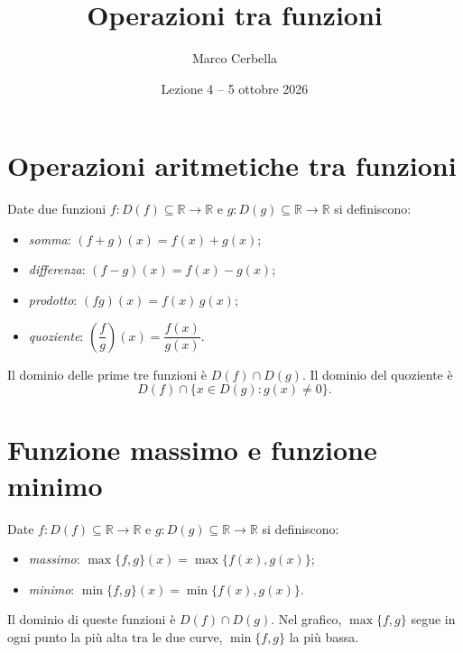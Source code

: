 \documentclass[11pt,a4paper]{article}
\title{Operazioni tra funzioni}
\author{Marco Cerbella}
\date{Lezione 4 -- 5 ottobre 2026}
\theoremstyle{definition}
\begin{document}
\maketitle

\section{Operazioni aritmetiche tra funzioni}

Date due funzioni $f : D(f) \subseteq \mathbb{R} \to \mathbb{R}$ e $g : D(g) \subseteq \mathbb{R} \to \mathbb{R}$ si definiscono:
\begin{itemize}
    \item \emph{somma}: $(f + g)(x) = f(x) + g(x)$;
    \item \emph{differenza}: $(f - g)(x) = f(x) - g(x)$;
    \item \emph{prodotto}: $(fg)(x) = f(x)\,g(x)$;
    \item \emph{quoziente}: $\left(\dfrac{f}{g}\right)(x) = \dfrac{f(x)}{g(x)}$.
\end{itemize}
Il dominio delle prime tre funzioni è $D(f) \cap D(g)$. Il dominio del quoziente è
\[
D(f) \cap \{x \in D(g) : g(x) \neq 0\}.
\]

\section{Funzione massimo e funzione minimo}

Date $f : D(f) \subseteq \mathbb{R} \to \mathbb{R}$ e $g : D(g) \subseteq \mathbb{R} \to \mathbb{R}$ si definiscono:
\begin{itemize}
    \item \emph{massimo}: $\max\{f, g\}(x) = \max\{f(x), g(x)\}$;
    \item \emph{minimo}: $\min\{f, g\}(x) = \min\{f(x), g(x)\}$.
\end{itemize}
Il dominio di queste funzioni è $D(f) \cap D(g)$. Nel grafico, $\max\{f, g\}$ segue in ogni punto la più alta tra le due curve, $\min\{f, g\}$ la più bassa.
\end{document}

